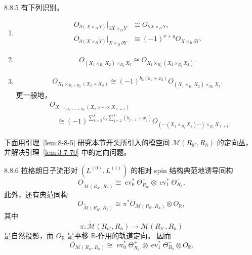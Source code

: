 \begin{lemma}{8.8.5}\label{lem:8-8-5}
有下列识别。
\begin{enumerate}[label=(\arabic*),leftmargin=2.8em]
\item
\[
\begin{aligned}
 O_{\partial(X\times_BY)}|_{\partial X\times_BY}
 &\cong O_{\partial X\times_BY},\\
 O_{\partial(X\times_BY)}|_{X\times_B\partial Y}
 &\cong(-1)^{x+y}O_{X\times_B\partial Y}.
\end{aligned}
\]

\item
\[
 O_{(X_1\times_{B_1}X_2)\times_{B_2}X_3}
 \cong
 O_{X_1\times_{B_1}(X_2\times_{B_2}X_3)}.
\]

\item
\[
\begin{aligned}
 O_{X_1\times_{B_1\times B_2}(X_2\times X_3)}
 \cong
 (-1)^{b_2(b_1+x_2)}
 O_{(X_1\times_{B_1}X_2)\times_{B_2}X_3}.
\end{aligned}
\]
更一般地，
\[
\begin{aligned}
 &O_{X_1\times_{B_1\times\cdots\times B_\ell}
 (X_2\times\cdots\times X_{\ell+1})}\\
 &\quad\cong
 (-1)^{
 \sum_{k=2}^{\ell}b_k
 \sum_{j=2}^{k}(b_{j-1}+x_j)}
 O_{(\cdots(X_1\times_{B_1}X_2)\cdots)
 \times_{B_\ell}X_{\ell+1}}.
\end{aligned}
\]
\end{enumerate}
\end{lemma}

下面用引理~\ref{lem:8-8-5} 研究本节开头所引入的模空间
$\mathcal M(R_{h'},R_h)$ 的定向丛，并解决引理~\ref{lem:3-7-70}
中的定向问题。

\begin{proposition}{8.8.6}\label{prop:8-8-6}
拉格朗日子流形对 $(L^{(0)},L^{(1)})$ 的相对 spin 结构典范地诱导同构
\[
 O_{\widetilde{\mathcal M}(R_{h'},R_h)}
 \cong
 \operatorname{ev}_0^*\Theta^+_{R_{h'}}
 \otimes
 \operatorname{ev}_1^*\Theta^-_{R_h}.
\]
此外，还有典范同构
\[
 O_{\widetilde{\mathcal M}(R_{h'},R_h)}
 \cong
 \pi^*O_{\mathcal M(R_{h'},R_h)}
 \otimes O_{\mathbb R},
\]
其中
\[
 \pi\colon
 \widetilde{\mathcal M}(R_{h'},R_h)
 \longrightarrow
 \mathcal M(R_{h'},R_h)
\]
是自然投影，而 $O_{\mathbb R}$ 是平移 $\mathbb R$-作用的轨道定向。%
因而
\[
 O_{\mathcal M(R_{h'},R_h)}
 \cong
 \operatorname{ev}_0^*\Theta^+_{R_{h'}}
 \otimes
 \operatorname{ev}_1^*\Theta^-_{R_h}
 \otimes O_{\mathbb R}.
\]
\end{proposition}

